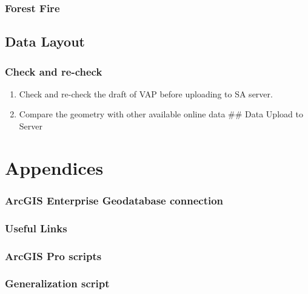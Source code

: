 \documentclass[]{book}
\providecommand{\tightlist}{%
  \setlength{\itemsep}{0pt}\setlength{\parskip}{0pt}}
\theoremstyle{definition}
\theoremstyle{definition}
\theoremstyle{definition}
\theoremstyle{remark}
\begin{document}
\subsection{Forest Fire}\label{forest-fire}

\section{Data Layout}\label{data-layout}

\subsection{Check and re-check}\label{check-and-re-check-1}

\begin{enumerate}
\def\labelenumi{\arabic{enumi}.}
\tightlist
\item
  Check and re-check the draft of VAP before uploading to SA server.
\item
  Compare the geometry with other available online data \#\# Data Upload
  to Server
\end{enumerate}

\chapter*{Appendices}\label{appendices}

\subsection*{ArcGIS Enterprise Geodatabase
connection}\label{arcgis-enterprise-geodatabase-connection-1}

\subsection*{Useful Links}\label{useful-links}

\subsection*{ArcGIS Pro scripts}\label{arcgis-pro-scripts}

\subsection*{Generalization script}\label{generalization-script}


\end{document}
